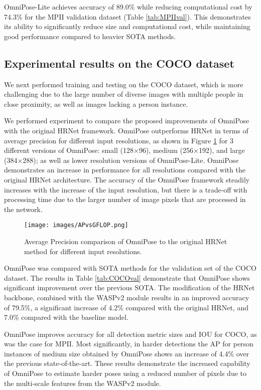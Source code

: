 \documentclass[10pt,twocolumn,letterpaper]{article}
\begin{document}
OmniPose-Lite achieves accuracy of 89.0\% while reducing computational cost by 74.3\% for the MPII validation dataset (Table \ref{tab:MPIIval}).  This  demonstrates its ability to significantly reduce size and computational cost, while maintaining good performance compared to heavier SOTA methods.



\subsection{Experimental results on the COCO dataset}
We next performed training and testing on the COCO dataset, which is more challenging due to the large number of diverse images with multiple people in close proximity, as well as images lacking a person instance.

We performed experiment to compare the proposed improvements of OmniPose with the original HRNet framework.
OmniPose outperforms HRNet in terms of average precision for different input resolutions, as shown in Figure \ref{fig:APvsGFLOP} for 3 different versions of OmniPose: small (128$\times$96), medium (256$\times$192), and large (384$\times$288); as well as lower resolution versions of OmniPose-Lite.
OmniPose demonstrates an increase in performance for all resolutions compared with the original HRNet architecture. The accuracy of the OmniPose framework steadily increases with the increase of the input resolution, but there is a trade-off with processing time due to the larger number of image pixels that are processed in the network.

\begin{figure}[h!]
\begin{center}
\texttt{[image: images/APvsGFLOP.png]}
\end{center}
  \caption{Average Precision comparison of OmniPose to the original HRNet method for different input resolutions.}
\label{fig:APvsGFLOP}
\end{figure}

OmniPose was compared with SOTA methods for the validation set of the COCO dataset. 
The results in Table \ref{tab:COCOval} demonstrate that OmniPose shows significant improvement over the previous SOTA. 
The modification of the HRNet backbone, combined with the WASPv2 module results in an improved accuracy of 79.5\%, a significant increase of 4.2\% compared with the original HRNet, and 7.0\% compared with the baseline model. 


OmniPose improves accuracy for all detection metric sizes and IOU for COCO, as was the case for MPII. Most significantly, in harder detections the AP for person instances of medium size obtained by OmniPose shows an increase of 4.4\% over the previous state-of-the-art.
These results demonstrate the increased capability of OmniPose to estimate harder poses using a reduced number of pixels due to the multi-scale features from the WASPv2 module.
\end{document}
